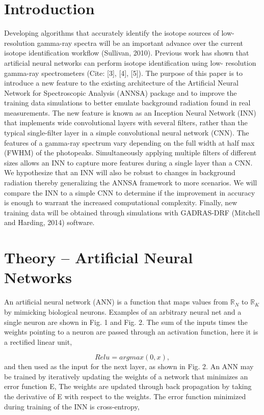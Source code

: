 \documentclass[11pt]{article}
\begin{document}
\section{Introduction}
Developing algorithms that accurately identify the isotope sources of low-resolution gamma-ray 
spectra will be an important advance over the current isotope identification workflow (Sullivan, 2010).
Previous work has shown that artificial neural networks can perform isotope identification using low-
resolution gamma-ray spectrometers (Cite: [3], [4], [5]). The purpose of this paper is to introduce 
a new feature to the existing architecture of the Artificial Neural Network for Spectroscopic Analysis 
(ANNSA) package and to improve the training data simulations to better emulate background radiation 
found in real measurements. The new feature is known as an Inception Neural Network (INN) that 
implements wide convolutional layers with several filters, rather than the typical single-filter layer 
in a simple convolutional neural network (CNN). The features of a gamma-ray spectrum vary depending 
on the full width at half max (FWHM) of the photopeaks. Simultaneously applying multiple filters of 
different sizes allows an INN to capture more features during a single layer than a CNN. We hypothesize 
that an INN will also be robust to changes in background radiation thereby generalizing the ANNSA 
framework to more scenarios. We will compare the INN to a simple CNN to determine if the improvement in 
accuracy is enough to warrant the increased computational complexity. Finally, new training data will 
be obtained through simulations with GADRAS-DRF (Mitchell and Harding, 2014) software.


\section{Theory -- Artificial Neural Networks}

An artificial neural network (ANN) is a function that maps values from ${\mathbb{R}}_{N}$ to ${\mathbb{R}}_{K}$ by mimicking biological 
neurons. Examples of an arbitrary neural net and a single neuron are shown in Fig. 1 and Fig. 2. The 
sum of the inputs times the weights pointing to a neuron are passed through an activation function, 
here it is a rectified linear unit,

\begin{equation}
Relu = argmax(0, x),
\end{equation}
and then used as the input for the next layer, as shown in Fig. 2. 
An ANN may be trained by iteratively updating the weights of a network that minimizes an error function E, 
The weights are updated through back propagation by taking the derivative of E with respect to the weights. 
The error function minimized during training of the INN is cross-entropy,
\end{document}

